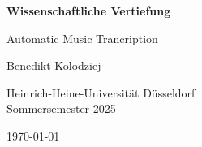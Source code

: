 \begin{titlepage}
    \centering
    \vspace*{2cm}

    {\Huge\bfseries Wissenschaftliche Vertiefung\par}
    \vspace{1.5cm}
    {\Large Automatic Music Trancription\par}
    \vspace{2cm}
    {\large Benedikt Kolodziej\par}
    \vspace{0.5cm}
    Heinrich-Heine-Universit\"at D\"usseldorf \\
    Sommersemester 2025

    \vfill
    \today
\end{titlepage}
